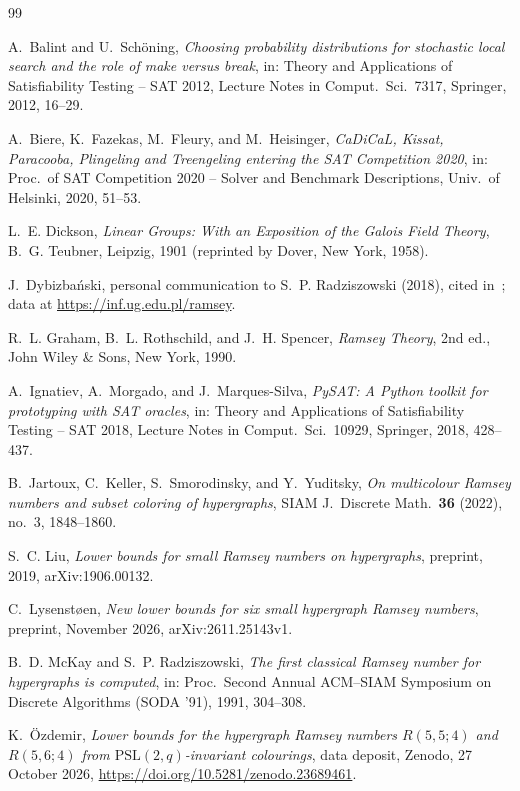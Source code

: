 \documentclass[11pt]{article}
\theoremstyle{remark}
\begin{document}
\begin{thebibliography}{99}
\small

A.~Balint and U.~Sch\"oning,
\emph{Choosing probability distributions for stochastic local search and the
role of make versus break},
in: Theory and Applications of Satisfiability Testing -- SAT 2012,
Lecture Notes in Comput.\ Sci.\ 7317, Springer, 2012, 16--29.

A.~Biere, K.~Fazekas, M.~Fleury, and M.~Heisinger,
\emph{CaDiCaL, Kissat, Paracooba, Plingeling and Treengeling entering the SAT
Competition 2020},
in: Proc.\ of SAT Competition 2020 -- Solver and Benchmark Descriptions,
Univ.\ of Helsinki, 2020, 51--53.

L.~E. Dickson,
\emph{Linear Groups: With an Exposition of the Galois Field Theory},
B.~G. Teubner, Leipzig, 1901 (reprinted by Dover, New York, 1958).

J.~Dybizba\'nski,
personal communication to S.~P. Radziszowski (2018), cited in~\cite{survey};
data at \url{https://inf.ug.edu.pl/ramsey}.

R.~L. Graham, B.~L. Rothschild, and J.~H. Spencer,
\emph{Ramsey Theory}, 2nd ed., John Wiley \& Sons, New York, 1990.

A.~Ignatiev, A.~Morgado, and J.~Marques-Silva,
\emph{PySAT: A Python toolkit for prototyping with SAT oracles},
in: Theory and Applications of Satisfiability Testing -- SAT 2018,
Lecture Notes in Comput.\ Sci.\ 10929, Springer, 2018, 428--437.

B.~Jartoux, C.~Keller, S.~Smorodinsky, and Y.~Yuditsky,
\emph{On multicolour Ramsey numbers and subset coloring of hypergraphs},
SIAM J.\ Discrete Math.\ \textbf{36} (2022), no.~3, 1848--1860.

S.~C. Liu,
\emph{Lower bounds for small Ramsey numbers on hypergraphs},
preprint, 2019, arXiv:1906.00132.

C.~Lysenst{\o}en,
\emph{New lower bounds for six small hypergraph Ramsey numbers},
preprint, November 2026, arXiv:2611.25143v1.

B.~D. McKay and S.~P. Radziszowski,
\emph{The first classical Ramsey number for hypergraphs is computed},
in: Proc.\ Second Annual ACM--SIAM Symposium on Discrete Algorithms (SODA '91),
1991, 304--308.

K.~\"Ozdemir,
\emph{Lower bounds for the hypergraph Ramsey numbers $R(5,5;4)$ and $R(5,6;4)$
from $\mathrm{PSL}(2,q)$-invariant colourings},
data deposit, Zenodo, 27 October 2026,
\url{https://doi.org/10.5281/zenodo.23689461}.


\end{thebibliography}
\end{document}
